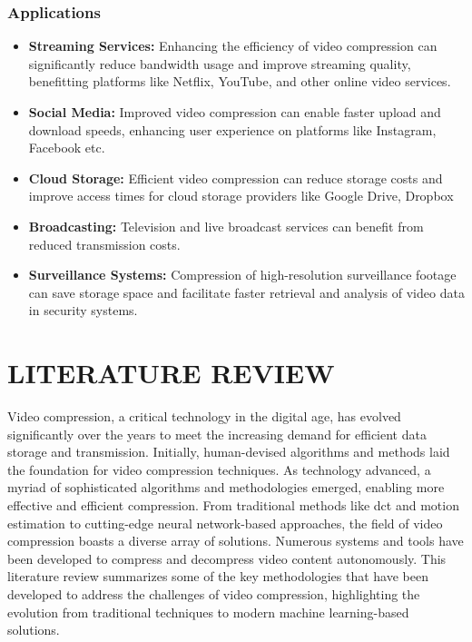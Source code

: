 \documentclass{ioereport}
\begin{document}
        \subsubsection{Applications}
        \begin{itemize}
            \item \textbf{Streaming Services:} Enhancing the efficiency of video compression can significantly reduce bandwidth usage and improve streaming quality, benefitting platforms like Netflix, YouTube, and other online video services.
            \item \textbf{Social Media:} Improved video compression can enable faster upload and download speeds, enhancing user experience on platforms like Instagram, Facebook etc.
            \item \textbf{Cloud Storage:} Efficient video compression can reduce storage costs and improve access times for cloud storage providers like Google Drive, Dropbox
            \item \textbf{Broadcasting:} Television and live broadcast services can benefit from reduced transmission costs.
            \item \textbf{Surveillance Systems:} Compression of high-resolution surveillance footage can save storage space and facilitate faster retrieval and analysis of video data in security systems.
        \end{itemize}
            
    \pagebreak
    
\section{\MakeUppercase{Literature Review}}
Video compression, a critical technology in the digital age, has evolved significantly over the years to meet the increasing demand for efficient data storage and transmission. Initially, human-devised algorithms and methods laid the foundation for video compression techniques. As technology advanced, a myriad of sophisticated algorithms and methodologies emerged, enabling more effective and efficient compression. From traditional methods like \gls{dct} and motion estimation to cutting-edge neural network-based approaches, the field of video compression boasts a diverse array of solutions. Numerous systems and tools have been developed to compress and decompress video content autonomously. This literature review summarizes some of the key methodologies that have been developed to address the challenges of video compression, highlighting the evolution from traditional techniques to modern machine learning-based solutions.
\end{document}
